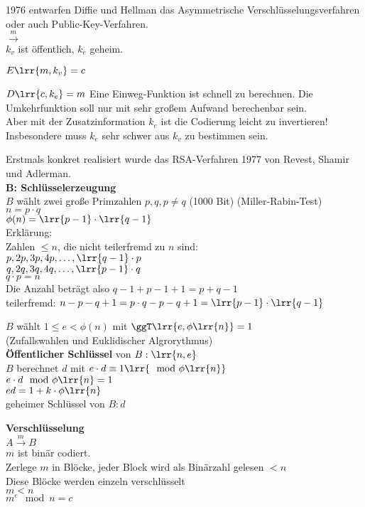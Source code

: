 	1976 entwarfen Diffie und Hellman das Asymmetrische Verschlüsselungsverfahren oder auch Public-Key-Verfahren.\\
	$\overset{m}{\longrightarrow}$ \\
	$k_v$ ist öffentlich, $k_e$ geheim.
		\item $E\lrr{m,k_v}=c$
		\item $D\lrr{c,k_e}=m$
	\subExEnd
	Eine Einweg-Funktion ist schnell zu berechnen. Die Umkehrfunktion soll nur mit sehr großem Aufwand berechenbar sein.\\
	Aber mit der Zusatzinformation $k_e$ ist die Codierung leicht zu invertieren!\\
	Insbesondere muss $k_e$ sehr schwer aus $k_v$ zu bestimmen sein.

	Erstmals konkret realisiert wurde das RSA-Verfahren 1977 von Revest, Shamir und Adlerman.\\
	\textbf{B: Schlüsselerzeugung}\\
	$B$ wählt zwei große Primzahlen $p,q,p\neq q$ (1000 Bit)
	(Miller-Rabin-Test)\\
	$n=p\cdot q$\\
	$\phi(n)=\lrr{p-1}\cdot\lrr{q-1}$\\
	Erklärung:\\
	Zahlen $\leq n$, die nicht teilerfremd zu $n$ sind:\\
	$p,2p,3p,4p,\dots,\lrr{q-1}\cdot p$\\
	$q,2q,3q,4q,\dots,\lrr{p-1}\cdot q$\\
	$q\cdot p = n$\\
	Die Anzahl beträgt also $q-1+p-1+1 = p+q-1$\\
	teilerfremd:
	$n-p-q+1=p\cdot q-p-q+1=\lrr{p-1}\cdot\lrr{q-1}$

	$B$ wählt $1\leq e<\phi(n)$ mit $\ggT\lrr{e,\phi\lrr{n}}=1$\\
	(Zufallswahlen und Euklidischer Algrorythmus)\\
	\textbf{Öffentlicher Schlüssel} von $B:\lrr{n,e}$\\
	$B$ berechnet $d$ mit $e\cdot d\equiv 1\lrr{\mod\phi\lrr{n}}$\\
	$e\cdot d\mod\phi\lrr{n}=1$\\
	$ed=1+k\cdot\phi\lrr{n}$\\
	geheimer Schlüssel von $B:d$

	\textbf{Verschlüsselung}\\
	$A\overset{m}{\rightarrow}B$\\
	$m$ ist binär codiert.\\
	Zerlege $m$ in Blöcke, jeder Block wird als Binärzahl gelesen $<n$\\
	Diese Blöcke werden einzeln verschlüsselt\\
	$m<n$\\
	$m^e\mod n=c$

